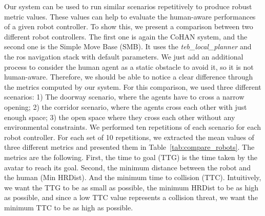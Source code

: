 Our system can be used to run similar scenarios repetitively to produce robust metric values. These values can help to evaluate the human-aware performances of a given robot controller. To show this, we present a comparison between two different robot controllers. The first one is again the CoHAN system, and the second one is the Simple Move Base (SMB). It uses the \textit{teb\_local\_planner} and the \acrshort{ros} navigation stack with default parameters. We just add an additional process to consider the human agent as a static obstacle to avoid it, so it is not human-aware. Therefore, we should be able to notice a clear difference through the metrics computed by our system. For this comparison, we used three different scenarios: 1) The doorway scenario, where the agents have to cross a narrow opening; 2) the corridor scenario, where the agents cross each other with just enough space; 3) the open space where they cross each other without any environmental constraints. We performed ten repetitions of each scenario for each robot controller. For each set of 10 repetitions, we extracted the mean values of three different metrics and presented them in Table~\ref{tab:compare_robots}. The metrics are the following. First, the time to goal (TTG) is the time taken by the avatar to reach its goal. Second, the minimum distance between the robot and the human (Min HRDist). And the minimum time to collision (TTC). Intuitively, we want the TTG to be as small as possible, the minimum HRDist to be as high as possible, and since a low TTC value represents a collision threat, we want the minimum TTC to be as high as possible. 

